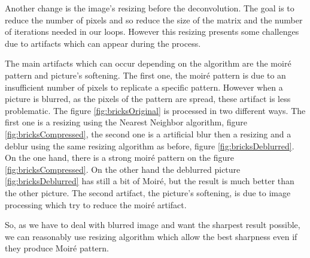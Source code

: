 Another change is the image's resizing before the deconvolution. The goal is to reduce the number of pixels and so reduce the size of the matrix and the number of iterations needed in our loops.  However this resizing presents some challenges due to artifacts which can appear during the process. 

The main artifacts which can occur depending on the algorithm are the moiré pattern and picture's softening.  
The first one, the moiré pattern is due to an insufficient number of pixels to replicate a specific pattern. However when a picture is blurred, as the pixels of the pattern are spread, these artifact is less problematic. The figure \ref{fig:bricksOriginal} is processed in two different ways. The first one is a resizing using the Nearest Neighbor algorithm, figure \ref{fig:bricksCompressed}, the second one is a artificial blur then a resizing and a deblur using the same resizing algorithm as before, figure \ref{fig:bricksDeblurred}. On the one hand, there is a strong moiré pattern on the figure \ref{fig:bricksCompressed}. On the other hand the deblurred picture \ref{fig:bricksDeblurred} has still a bit of Moiré, but the result is much better than the other picture. 
The second artifact, the picture's softening, is due to image processing which try to reduce the moiré artifact. 

So, as we have to deal with blurred image and want the sharpest result possible, we can reasonably use resizing algorithm which allow the best sharpness even if they produce Moiré pattern. 

